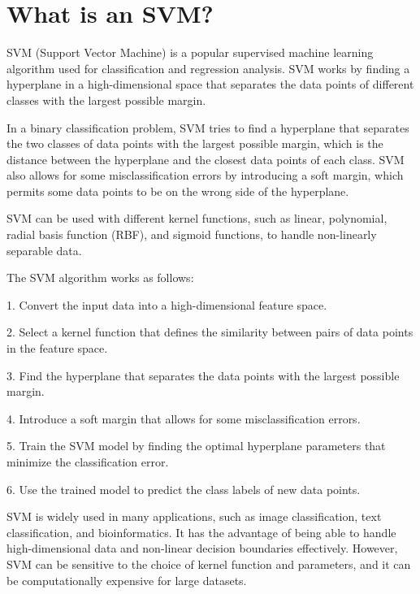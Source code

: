 \section{What is an SVM?}
SVM (Support Vector Machine) is a popular supervised machine learning algorithm used for classification and regression analysis. SVM works by finding a hyperplane in a high-dimensional space that separates the data points of different classes with the largest possible margin.

In a binary classification problem, SVM tries to find a hyperplane that separates the two classes of data points with the largest possible margin, which is the distance between the hyperplane and the closest data points of each class. SVM also allows for some misclassification errors by introducing a soft margin, which permits some data points to be on the wrong side of the hyperplane.

SVM can be used with different kernel functions, such as linear, polynomial, radial basis function (RBF), and sigmoid functions, to handle non-linearly separable data.

The SVM algorithm works as follows:

1. Convert the input data into a high-dimensional feature space.

2. Select a kernel function that defines the similarity between pairs of data points in the feature space.

3. Find the hyperplane that separates the data points with the largest possible margin.

4. Introduce a soft margin that allows for some misclassification errors.

5. Train the SVM model by finding the optimal hyperplane parameters that minimize the classification error.

6. Use the trained model to predict the class labels of new data points.

SVM is widely used in many applications, such as image classification, text classification, and bioinformatics. It has the advantage of being able to handle high-dimensional data and non-linear decision boundaries effectively. However, SVM can be sensitive to the choice of kernel function and parameters, and it can be computationally expensive for large datasets.

